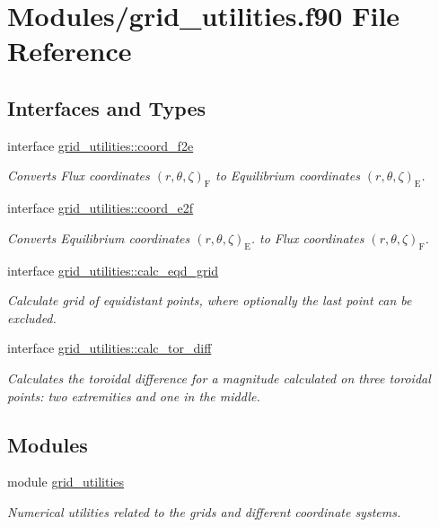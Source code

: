 \hypertarget{grid__utilities_8f90}{}\section{Modules/grid\+\_\+utilities.f90 File Reference}
\label{grid__utilities_8f90}
\subsection*{Interfaces and Types}
\begin{DoxyCompactItemize}
\item 
interface \hyperlink{interfacegrid__utilities_1_1coord__f2e}{grid\+\_\+utilities\+::coord\+\_\+f2e}
\begin{DoxyCompactList}\small\item\em Converts Flux coordinates $\left(r,\theta,\zeta\right)_\text{F}$ to Equilibrium coordinates $\left(r,\theta,\zeta\right)_\text{E}$. \end{DoxyCompactList}\item 
interface \hyperlink{interfacegrid__utilities_1_1coord__e2f}{grid\+\_\+utilities\+::coord\+\_\+e2f}
\begin{DoxyCompactList}\small\item\em Converts Equilibrium coordinates $\left(r,\theta,\zeta\right)_\text{E}$. to Flux coordinates $\left(r,\theta,\zeta\right)_\text{F}$. \end{DoxyCompactList}\item 
interface \hyperlink{interfacegrid__utilities_1_1calc__eqd__grid}{grid\+\_\+utilities\+::calc\+\_\+eqd\+\_\+grid}
\begin{DoxyCompactList}\small\item\em Calculate grid of equidistant points, where optionally the last point can be excluded. \end{DoxyCompactList}\item 
interface \hyperlink{interfacegrid__utilities_1_1calc__tor__diff}{grid\+\_\+utilities\+::calc\+\_\+tor\+\_\+diff}
\begin{DoxyCompactList}\small\item\em Calculates the toroidal difference for a magnitude calculated on three toroidal points\+: two extremities and one in the middle. \end{DoxyCompactList}\end{DoxyCompactItemize}
\subsection*{Modules}
\begin{DoxyCompactItemize}
\item 
module \hyperlink{namespacegrid__utilities}{grid\+\_\+utilities}
\begin{DoxyCompactList}\small\item\em Numerical utilities related to the grids and different coordinate systems. \end{DoxyCompactList}\end{DoxyCompactItemize}
